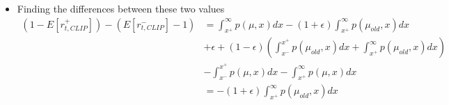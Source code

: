 \documentclass[a4paper]{article}
\begin{document}
\begin{itemize}
\begin{align*}
        1 - 
        \left(
        \int_{x^{-}}^{x^{+}}p(\mu_{old}, x)dx
        +
        \int_{x^{+}}^{\infty}p(\mu_{old}, x)dx
        \right)
        \right)
        -\\
        &\left(1 - 
        \left(
        \int_{x^{-}}^{x^{+}}p(\mu, x)dx 
        + 
        \int_{x^{+}}^{\infty}p(\mu, x)dx 
        \right)
        \right)
        \\
        &= 
        (1 - \epsilon)\left(
        1 - 
        \int_{x^{-}}^{x^{+}}p(\mu_{old}, x)dx
        -
        \int_{x^{+}}^{\infty}p(\mu_{old}, x)dx
        \right)
        -\\
        &\left(1 - 
        \int_{x^{-}}^{x^{+}}p(\mu, x)dx 
        - 
        \int_{x^{+}}^{\infty}p(\mu, x)dx 
        \right)
        \\
        &= 
        1 - \epsilon
        - 
        (1 - \epsilon)
        \left(
        \int_{x^{-}}^{x^{+}}p(\mu_{old}, x)dx
        +
        \int_{x^{+}}^{\infty}p(\mu_{old}, x)dx
        \right)
        - 1 \\
        &+ 
        \int_{x^{-}}^{x^{+}}p(\mu, x)dx 
        + 
        \int_{x^{+}}^{\infty}p(\mu, x)dx 
        \\
        &=
        -\epsilon
        - 
        (1 - \epsilon)
        \left(
        \int_{x^{-}}^{x^{+}}p(\mu_{old}, x)dx
        +
        \int_{x^{+}}^{\infty}p(\mu_{old}, x)dx
        \right)\\
        &+ 
        \int_{x^{-}}^{x^{+}}p(\mu, x)dx 
        + 
        \int_{x^{+}}^{\infty}p(\mu, x)dx 
        \\
    \end{align*}
    \item Finding the differences between these two values
    \begin{align*}
        (1 - E[r_{t, CLIP}^{+}]) - (E[r_{t, CLIP}^{-}] - 1)
        &=
        \int_{x^{+}}^{\infty}
        p(\mu, x)
        dx -
        (1 + \epsilon)
        \int_{x^{+}}^{\infty}p(\mu_{old}, x)dx\\
        &+
        \epsilon
        + 
        (1 - \epsilon)
        \left(
        \int_{x^{-}}^{x^{+}}p(\mu_{old}, x)dx
        +
        \int_{x^{+}}^{\infty}p(\mu_{old}, x)dx
        \right)\\
        &- 
        \int_{x^{-}}^{x^{+}}p(\mu, x)dx 
        - 
        \int_{x^{+}}^{\infty}p(\mu, x)dx 
        \\
        &=
        - (1 + \epsilon)
        \int_{x^{+}}^{\infty}p(\mu_{old}, x)dx\\

\end{align*}
\end{itemize}
\end{document}
